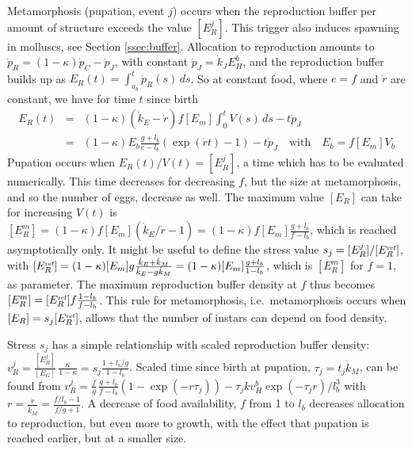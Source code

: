 Metamorphosis (pupation, event $j$) occurs when the reproduction buffer per amount of structure exceeds the value $[E_R^j]$.
This trigger also induces spawning in molluscs, see Section \ref{ssec:buffer}.
Allocation to reproduction amounts to $\dot{p}_R = (1 - \kappa) \dot{p}_C - \dot{p}_J$, with constant $\dot{p}_J = \dot{k}_J E_H^b$, and the reproduction buffer builds up as $E_R(t) = \int_{a_b}^t \dot{p}_R(s) \, ds$. 
So at constant food, where $e = f$ and $\dot{r}$ are constant, we have for time $t$ since birth
\begin{eqnarray*} 
  E_R(t) &=& (1 - \kappa) (\dot{k}_E - \dot{r}) f [E_m] \int_0^t V(s) \, ds - t \dot{p}_J 
  \\
  &=& (1 - \kappa) E_b \frac{g + l_b} {e - l_b} (\exp(\dot{r} t) - 1) - t \dot{p}_J \quad \mbox{with} \quad E_b = f [E_m] V_b
\end{eqnarray*}
Pupation occurs when $E_R(t)/ V(t) = [E_R^j]$, a time which has to be evaluated numerically.
This time decreases for decreasing $f$, but the size at metamorphosis, and so the number of eggs, decrease as well.
The maximum value $[E_R]$ can take for increasing $V(t)$ is $[E_R^m] = (1 - \kappa) f [E_m] (\dot{k}_E/ \dot{r} - 1) = (1 - \kappa) f [E_m] \frac{g + l_b} {f - l_b}$, which is reached asymptotically only.
It might be useful to define the stress value $s_j = [E_R^j]/ [E_R^{\mbox{\tiny ref}}]$, with $[E_R^{\mbox{\tiny ref}}] =  (1 - \kappa) [E_m] g \frac{\dot{k}_E + \dot{k}_M} {\dot{k}_E - g \dot{k}_M} = (1 - \kappa) [E_m] \frac{g + l_b} {1 - l_b}$, which is $[E_R^m]$ for $f = 1$, as parameter.
The maximum reproduction buffer density at $f$ thus becomes $[E_R^m] = [E_R^{\mbox{\tiny ref}}] f \frac{1 - l_b} { f - l_b}$. 
This rule for metamorphosis, i.e.\ metamorphosis occurs when $[E_R] = s_j [E_R^{\mbox{\tiny ref}}]$, allows that the number of instars can depend on food density.

Stress $s_j$ has a simple relationship with scaled reproduction buffer density: $v_R^j = \frac{[E_R^j]} {[E_G]} \, \frac{\kappa} {1 - \kappa} = s_j \frac{1 + l_b/ g} {1 - l_b}$.
Scaled time since birth at pupation, $\tau_j = t_j \dot{k}_M$, can be found from $v_R^j = \frac{f} {g} \, \frac{g + l_b} {f - l_b} (1 - \exp( - r \tau_j)) - \tau_j k v_H^b \exp(-\tau_j r)/ l_b^3$ with $r = \frac{\dot{r}} {\dot{k}_M} = \frac{f/ l_b - 1} {f/ g + 1}$.
A decrease of food availability, $f$ from 1 to $l_b$ decreases allocation to reproduction, but even more to growth, with the effect that pupation is reached earlier, but at a smaller size.

